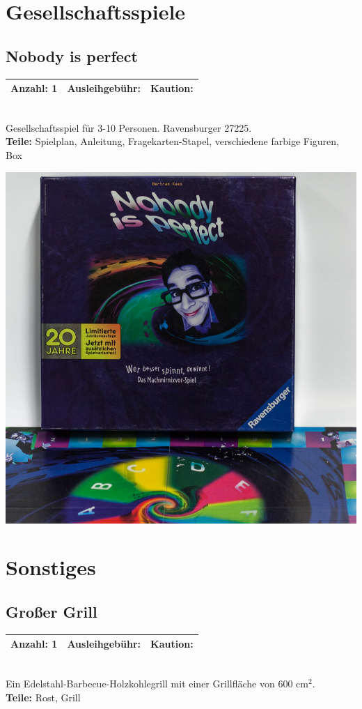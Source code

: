 \documentclass[a4paper]{article}
\newcommand{\infobox}[3] %
        {\par
                \begin{tabular}{| c | c | c| }
                \hline
                Anzahl: #1 & Ausleihgebühr: \EUR{#2} & Kaution: \EUR{#3}   \\
                \hline
                \end{tabular} \\
        }
\begin{document}




\section{Gesellschaftsspiele}

\subsection{Nobody is perfect}
\infobox{1}{0}{0}
Gesellschaftsspiel für 3-10 Personen. Ravensburger 27225. \\
\textbf{Teile:} Spielplan, Anleitung, Fragekarten-Stapel, verschiedene farbige Figuren, Box

\includegraphics[width=.3\textwidth]{Nobody is perfect.jpg}


\section{Sonstiges}

\subsection{Großer Grill}
\infobox{1}{5}{0}
Ein Edelstahl-Barbecue-Holzkohlegrill mit einer Grillfläche von 600 cm$^2$. \\
\textbf{Teile:} Rost, Grill

\end{document}
